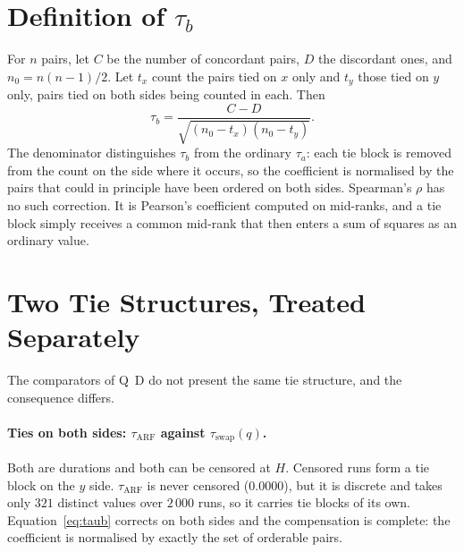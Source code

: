 \documentclass[11pt,a4paper]{article}
\begin{document}
\section{Definition of $\tau_b$}

For $n$ pairs, let $C$ be the number of concordant pairs, $D$ the discordant ones, and
$n_0 = n(n-1)/2$. Let $t_x$ count the pairs tied on $x$ only and $t_y$ those tied on $y$
only, pairs tied on both sides being counted in each. Then
\begin{equation}
  \tau_b = \frac{C - D}{\sqrt{(n_0 - t_x)(n_0 - t_y)}}.
  \label{eq:taub}
\end{equation}
The denominator distinguishes $\tau_b$ from the ordinary $\tau_a$: each tie block is
removed from the count on the side where it occurs, so the coefficient is normalised by
the pairs that could in principle have been ordered on both sides. Spearman's $\rho$ has no
such correction. It is Pearson's coefficient computed on mid-ranks, and a tie block simply
receives a common mid-rank that then enters a sum of squares as an ordinary value.

\section{Two Tie Structures, Treated Separately}

The comparators of Q~D do not present the same tie structure, and the consequence differs.

\paragraph{Ties on both sides: $\tau_{\mathrm{ARF}}$ against $\tau_{\mathrm{swap}}(q)$.}
Both are durations and both can be censored at $H$. Censored runs form a tie block on the
$y$ side. $\tau_{\mathrm{ARF}}$ is never censored ($0.0000$), but it is discrete and takes
only $321$ distinct values over $2\,000$ runs, so it carries tie blocks of its own.
Equation~\eqref{eq:taub} corrects on both sides and the compensation is complete: the
coefficient is normalised by exactly the set of orderable pairs.
\end{document}
